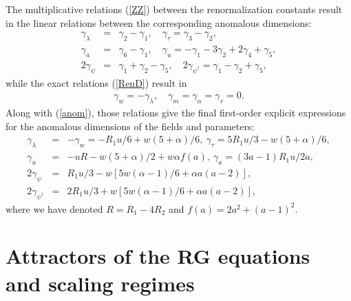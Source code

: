 \documentclass[12pt]{iopart}
\begin{document}
The multiplicative relations (\ref{ZZ}) between the
renormalization constants result in the linear relations between
the corresponding anomalous dimensions:
\begin{eqnarray}
\gamma_{\lambda} &=&  \gamma_{2} -\gamma_{1}, \quad
\gamma_{\tau} =  \gamma_{3} -\gamma_{2} ,
\nonumber \\
\gamma_{a} &=&  \gamma_{6} -\gamma_{1}, \quad \gamma_{u} =
-\gamma_{1}- 3\gamma_{2} +2\gamma_{4} + \gamma_{5},
 \nonumber \\
2\gamma_{\psi} &=& \gamma_{1} +\gamma_{2} -\gamma_{5}, \quad
2\gamma_{\psi^{\dag}}= \gamma_{1} - \gamma_{2} + \gamma_{5},
\label{aesoC}
\end{eqnarray}
while the exact relations (\ref{RenD}) result in
\begin{eqnarray}
\gamma_{w} =-\gamma_{\lambda}, \quad
\gamma_{m} =\gamma_{\alpha} =\gamma_{v} = 0.
\label{exi}
\end{eqnarray}
Along with (\ref{anom}), those relations give the final first-order explicit
expressions for the anomalous dimensions of the fields and parameters:
\begin{eqnarray}
\gamma_{\lambda} &=& - \gamma_{w} = -R_{1}u/6 + w(5+\alpha)/6, \
\gamma_{\tau} = 5R_{1}u/3-w(5+\alpha)/6,
\nonumber \\
\gamma_{u} &=& -uR - w(5+\alpha)/2 +w\alpha f(a), \
\gamma_{a} = (3a-1)R_{1}u /2a,
\nonumber \\
2\gamma_{\psi} &=& R_{1}u/3 -w\left[ 5w(\alpha-1)/6 +\alpha a(a-2)\right],
\nonumber \\
2\gamma_{\psi^{\dag}} &=&
2R_{1}u/3 +w\left[ 5w(\alpha-1)/6 +\alpha a(a-2)\right],
\label{KK}
\end{eqnarray}
where we have denoted $R=R_1-4R_2$ and $f(a)=2a^{2}+(a-1)^{2}$.



\section{Attractors of the RG equations and scaling regimes} \label{sec:FPS}
\end{document}
